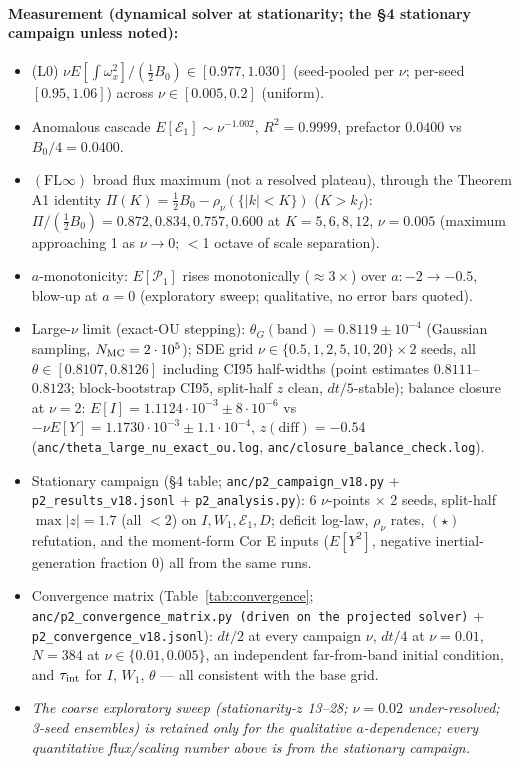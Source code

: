 \documentclass[11pt]{article}
\theoremstyle{remark}
\theoremstyle{plain}
\begin{document}
\paragraph{Measurement (dynamical solver at stationarity; the \S4 stationary campaign unless noted):}
\begin{itemize}
\item (L0) $\nu E[\int\omega_x^2]/(\tfrac12 B_0) \in [0.977, 1.030]$ (seed-pooled per $\nu$; per-seed $[0.95, 1.06]$) across $\nu \in [0.005, 0.2]$ (uniform).
\item Anomalous cascade $E[\mathcal{E}_1] \sim \nu^{-1.002}$, $R^2=0.9999$, prefactor $0.0400$ vs $B_0/4 = 0.0400$.
\item $(\mathrm{FL}\infty)$ broad flux maximum (not a resolved plateau), through the Theorem A1 identity $\Pi(K) = \tfrac12 B_0 - \rho_\nu(\{|k|<K\})$ ($K>k_f$): $\Pi/(\tfrac12 B_0) = 0.872, 0.834, 0.757, 0.600$ at $K = 5, 6, 8, 12$, $\nu=0.005$ (maximum approaching 1 as $\nu\to0$; $<$1 octave of scale separation).
\item $a$-monotonicity: $E[\mathcal{P}_1]$ rises monotonically ($\approx3\times$) over $a: -2\to-0.5$, blow-up at $a=0$ (exploratory sweep; qualitative, no error bars quoted).
\item Large-$\nu$ limit (exact-OU stepping): $\theta_G(\text{band}) = 0.8119\pm10^{-4}$
  (Gaussian sampling, $N_{\rm MC}=2\cdot10^5$); SDE grid $\nu\in\{0.5,1,2,5,10,20\}\times2$ seeds,
  all $\theta\in[0.8107,0.8126]$ including CI95 half-widths (point estimates
  $0.8111$--$0.8123$; block-bootstrap CI95, split-half $z$ clean,
  $dt/5$-stable); balance closure at $\nu=2$: $E[I]=1.1124\cdot10^{-3}\pm8\cdot10^{-6}$
  vs $-\nu E[Y]=1.1730\cdot10^{-3}\pm1.1\cdot10^{-4}$, $z(\mathrm{diff})=-0.54$
  (\texttt{anc/theta\_large\_nu\_exact\_ou.log}, \texttt{anc/closure\_balance\_check.log}).
\item Stationary campaign (\S4 table; \texttt{anc/p2\_campaign\_v18.py}
  + \texttt{p2\_results\_v18.jsonl} + \texttt{p2\_analysis.py}): 6 $\nu$-points
  $\times$ 2 seeds, split-half $\max|z| = 1.7$ (all $<2$) on $I, W_1,
  \mathcal{E}_1, D$; deficit log-law, $\rho_\nu$ rates, $(\star)$ refutation, and
  the moment-form Cor E inputs ($E[Y^2]$, negative inertial-generation fraction $0$) all from the
  same runs.
\item Convergence matrix (Table~\ref{tab:convergence};
  \texttt{anc/p2\_convergence\_matrix.py (driven on the projected solver)} + \texttt{p2\_convergence\_v18.jsonl}): $dt/2$ at
  every campaign $\nu$, $dt/4$ at $\nu=0.01$, $N=384$ at $\nu \in \{0.01, 0.005\}$,
  an independent far-from-band initial condition, and $\tau_{\rm int}$ for $I$, $W_1$,
  $\theta$ --- all consistent with the base grid.
\item \emph{The coarse exploratory sweep (stationarity-$z$ 13--28; $\nu=0.02$
  under-resolved; 3-seed ensembles) is retained only for the qualitative $a$-dependence;
  every quantitative flux/scaling number above is from the stationary campaign.}
\end{itemize}
\end{document}
